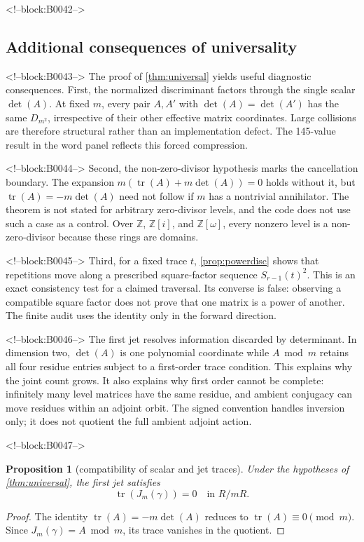 \documentclass[11pt,a4paper]{article}
\newtheorem{proposition}[theorem]{Proposition}
\theoremstyle{definition}
\theoremstyle{remark}
\newcommand{\tr}{\operatorname{tr}}
\newcommand{\Gauss}{\mathbb{Z}[i]}
\newcommand{\Eis}{\mathbb{Z}[\omega]}
\begin{document}
<!--block:B0042-->
\subsection{Additional consequences of universality}

<!--block:B0043-->
The proof of \cref{thm:universal} yields useful diagnostic consequences. First, the normalized discriminant factors through the single scalar \(\det(A)\). At fixed \(m\), every pair \(A,A'\) with \(\det(A)=\det(A')\) has the same \(D_{m^2}\), irrespective of their other effective matrix coordinates. Large collisions are therefore structural rather than an implementation defect. The 145-value result in the word panel reflects this forced compression.

<!--block:B0044-->
Second, the non-zero-divisor hypothesis marks the cancellation boundary. The expansion \(m(\tr(A)+m\det(A))=0\) holds without it, but \(\tr(A)=-m\det(A)\) need not follow if \(m\) has a nontrivial annihilator. The theorem is not stated for arbitrary zero-divisor levels, and the code does not use such a case as a control. Over \(\mathbb Z\), \(\Gauss\), and \(\Eis\), every nonzero level is a non-zero-divisor because these rings are domains.

<!--block:B0045-->
Third, for a fixed trace \(t\), \cref{prop:powerdisc} shows that repetitions move along a prescribed square-factor sequence \(S_{r-1}(t)^2\). This is an exact consistency test for a claimed traversal. Its converse is false: observing a compatible square factor does not prove that one matrix is a power of another. The finite audit uses the identity only in the forward direction.

<!--block:B0046-->
The first jet resolves information discarded by determinant. In dimension two, \(\det(A)\) is one polynomial coordinate while \(A\bmod m\) retains all four residue entries subject to a first-order trace condition. This explains why the joint count grows. It also explains why first order cannot be complete: infinitely many level matrices have the same residue, and ambient conjugacy can move residues within an adjoint orbit. The signed convention handles inversion only; it does not quotient the full ambient adjoint action.

<!--block:B0047-->
\begin{proposition}[compatibility of scalar and jet traces]\label{prop:jettrace}
Under the hypotheses of \cref{thm:universal}, the first jet satisfies
\[
 \tr(J_m(\gamma))=0\quad\text{in }R/mR.
\]
\end{proposition}
\begin{proof}
The identity \(\tr(A)=-m\det(A)\) reduces to \(\tr(A)\equiv0\pmod m\). Since \(J_m(\gamma)=A\bmod m\), its trace vanishes in the quotient.
\end{proof}
\end{document}
